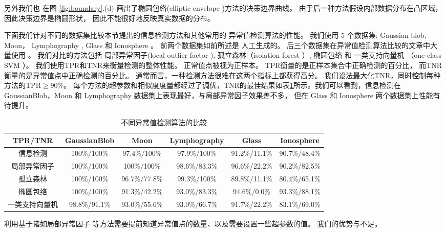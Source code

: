 另外我们也
在图 \ref{fig:boundary}.(d) 画出了椭圆包络(elliptic envelope \citep{rousseeuw1999fast} )方法的决策边界曲线。
由于后一种方法假设内部数据分布在凸区域，因此决策边界是椭圆形状，
因此不能很好地反映真实数据的分布。

下面我们针对不同的数据集比较本节提出的信息检测方法和其他常用的
异常值检测算法的性能。
我们使用 5 个数据集: Gaussian-blob, Moon， Lymphography
\cite{lazarevic2005feature}, Glass 和 Ionosphere \cite{keller2012hics}。 
前两个数据集如前所述是
人工生成的。
后三个数据集在异常值检测算法比较的文章中大量使用
\cite{campos2016evaluation}。
我们对比的方法包括
局部异常因子(local outlier factor \citep{Breunig}), 孤立森林（isolation forest \citep{if}）, 
椭圆包络  和
一类支持向量机 （one class SVM \citep{svm}）。 
我们使用TPR和TNR来衡量检测的整体性能。
正常值点被视为正样本。
TPR衡量的是正样本集合中正确检测的百分比，
而TNR衡量的是异常值点中正确检测的百分比。
通常而言，一种检测方法很难在这两个指标上都获得高分。
我们设法最大化TNR，同时控制每种方法的TPR$\geq 90\%$。
每个方法的超参数和相似度度量都经过了调优，TNR的最佳结果如表\ref{tab:odm}所示。我们可以看到，信息检测在 GaussianBlob，Moon 和
Lymphography 数据集上表现最好，与局部异常因子效果差不多，
但在 Glass 和  Ionosphere 两个数据集上性能有待提升。
\begin{table}
  \begin{adjustbox}{width=\columnwidth,center}
\begin{tabular}{cccccc}
  \hline
         TPR/TNR        &  GaussianBlob   &      Moon       &  Lymphography  &     Glass     &  Ionosphere   \\
  \hline
      信息检测    & 100\%/100\% & 97.4\%/100\%  & 97.9\%/100\% & 91.2\%/11.1\% & 90.7\%/48.4\% \\
      局部异常因子 & 100\%/100\% & 100\%/100\% & 98.6\%/83.3\%  & 96.6\%/22.2\% & 90.2\%/82.5\% \\
   孤立森林   & 100\%/100\% &  96.7\%/77.8\%  & 99.3\%/100\% & 89.8\%/11.1\% & 80.4\%/65.1\% \\
    椭圆包络   & 100\%/100\% &  91.3\%/42.2\%  & 93.0\%/83.3\%  & 94.6\%/0.0\%  & 93.3\%/88.1\% \\
     一类支持向量机     &  98.8\%/91.1\%  &  93.0\%/55.6\%  & 93.0\%/66.7\%  & 91.7\%/22.2\% & 83.1\%/69.0\% \\
  \hline
  \end{tabular}
\end{adjustbox}
\caption{不同异常值检测算法的比较}\label{tab:odm}
\end{table}

利用基于诸如局部异常因子 \cite{Breunig} 等方法需要提前知道异常值点的数量、以及需要设置一些超参数的值。
我们的优势与不足。

